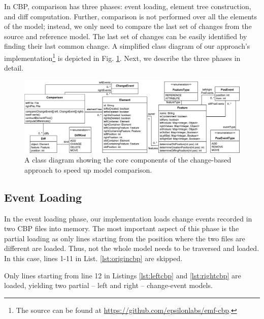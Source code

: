 In CBP, comparison has three phases: event loading, element tree construction, and diff computation.
Further, comparison is not performed over all the elements of the model; instead, we only need to compare the last set of changes from the source and reference model.
The last set of changes can be easily identified by finding their last common change.
A simplified class diagram of our approach's implementation\footnote{The source can be found at \url{https://github.com/epsilonlabs/emf-cbp}.} is depicted in Fig. \ref{fig:approach_class_diagram}. 
Next, we describe the three phases in detail.

\begin{figure}
    \includegraphics[width=\linewidth]{TreeClassDiagram}
    \caption{A class diagram showing the core components of the change-based approach to speed up model comparison.}
    \label{fig:approach_class_diagram}
\end{figure}


\subsection{Event Loading}
\label{sec:event_loading}
In the event loading phase, our implementation loads change events recorded in two CBP files into memory.
The most important aspect of this phase is the partial loading as only lines starting from the position where the two files are different are loaded.
Thus, not the whole model needs to be traversed and loaded.
In this case, lines 1-11 in List. \ref{lst:origincbp} are skipped.

Only lines starting from line 12 in Listings \ref{lst:leftcbp} and \ref{lst:rightcbp} are loaded, yielding two partial -- left and right -- change-event models. 

